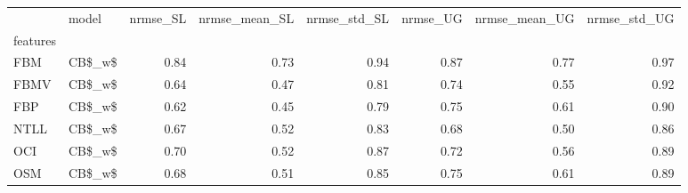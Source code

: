 \begin{tabular}{llrrrrrr}
\toprule
{} &   model &  nrmse\_SL &  nrmse\_mean\_SL &  nrmse\_std\_SL &  nrmse\_UG &  nrmse\_mean\_UG &  nrmse\_std\_UG \\
features &         &           &                &               &           &                &               \\
\midrule
FBM      &  CB\$\_w\$ &      0.84 &           0.73 &          0.94 &      0.87 &           0.77 &          0.97 \\
FBMV     &  CB\$\_w\$ &      0.64 &           0.47 &          0.81 &      0.74 &           0.55 &          0.92 \\
FBP      &  CB\$\_w\$ &      0.62 &           0.45 &          0.79 &      0.75 &           0.61 &          0.90 \\
NTLL     &  CB\$\_w\$ &      0.67 &           0.52 &          0.83 &      0.68 &           0.50 &          0.86 \\
OCI      &  CB\$\_w\$ &      0.70 &           0.52 &          0.87 &      0.72 &           0.56 &          0.89 \\
OSM      &  CB\$\_w\$ &      0.68 &           0.51 &          0.85 &      0.75 &           0.61 &          0.89 \\
\bottomrule
\end{tabular}
